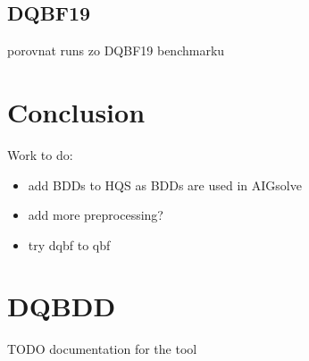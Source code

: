 \documentclass[
  digital, %
  color,
  twoside, %
  table,   %
  nolof,     %
  nolot,     %
]{fithesis3}
\theoremstyle{definition}
\theoremstyle{remark}
\begin{document}
\section{DQBF19}
porovnat runs zo DQBF19 benchmarku

\chapter{Conclusion}
Work to do:
\begin{itemize}
    \item add BDDs to HQS as BDDs are used in AIGsolve
    \item add more preprocessing?
    \item try dqbf to qbf 
\end{itemize}

\begingroup
\setlength{\emergencystretch}{8em}
\printbibliography[heading=bibintoc]
\endgroup



\appendix %
\chapter{DQBDD}
\label{appendix:DQBDD}
TODO documentation for the tool 
\end{document}
